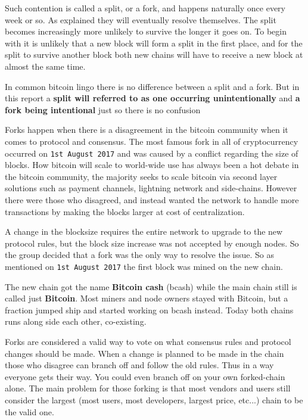 Such contention is called a split, or a fork, and happens naturally once every week or so. As explained they will eventually resolve themselves. The split becomes increasingly more unlikely to survive the longer it goes on. To begin with it is unlikely that a new block will form a split in the first place, and for the split to survive another block both new chains will have to receive a new block at almost the same time.\cite{antonopoulos_2017}

In common bitcoin lingo there is no difference between a split and a fork. But in this report a \textbf{split will referred to as one occurring unintentionally} and \textbf{a fork being intentional} just so there is no confusion

Forks happen when there is a disagreement in the bitcoin community when it comes to protocol and consensus. The most famous fork in all of cryptocurrency occurred on \texttt{1st August 2017} and was caused by a conflict regarding the size of blocks. How bitcoin will scale to world-wide use has always been a hot debate in the bitcoin community, the majority seeks to scale bitcoin via second layer solutions such as payment channels, lightning network and side-chains. However there were those who disagreed, and instead wanted the network to handle more transactions by making the blocks larger at cost of centralization. 

A change in the blocksize requires the entire network to upgrade to the new protocol rules, but the block size increase was not accepted by enough nodes. So the group decided that a fork was the only way to resolve the issue. So as mentioned on \texttt{1st August 2017} the first block was mined on the new chain.\cite{selena_2017}

The new chain got the name \textbf{Bitcoin cash} (bcash) while the main chain still is called just \textbf{Bitcoin}. Most miners and node owners stayed with Bitcoin, but a fraction jumped ship and started working on bcash instead. Today both chains runs along side each other, co-existing.\cite{selena_2017}

Forks are considered a valid way to vote on what consensus rules and protocol changes should be made. When a change is planned to be made in the chain those who disagree can branch off and follow the old rules. Thus in a way everyone gets their way. You could even branch off on your own forked-chain alone. The main problem for those forking is that most vendors and users still consider the largest (most users, most developers, largest price, etc...) chain to be the valid one. 


